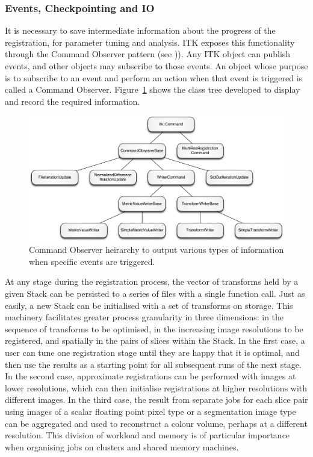 		\subsubsection{Events, Checkpointing and IO} %
		\label{ssub:events_checkpointing_and_io}
			It is necessary to save intermediate information about the progress of the registration, for parameter tuning and analysis. ITK exposes this functionality through the Command Observer pattern (see \cite{Gamma1995})). Any ITK object can publish events, and other objects may subscribe to those events. An object whose purpose is to subscribe to an event and perform an action when that event is triggered is called a Command Observer. Figure~\ref{fig:command_heirarchy} shows the class tree developed to display and record the required information.
			
    \begin{figure}[htbp]
      \centering
      \includegraphics[width=\pagewidth]{Ch5/Figs/command_heirarchy}
      \caption{Command Observer heirarchy to output various types of information when specific events are triggered.}
      \label{fig:command_heirarchy}
    \end{figure}
		
      At any stage during the registration process, the vector of transforms held by a given Stack can be persisted to a series of files with a single function call. Just as easily, a new Stack can be initialised with a set of transforms on storage. This machinery facilitates greater process granularity in three dimensions: in the sequence of transforms to be optimised, in the increasing image resolutions to be registered, and spatially in the pairs of slices within the Stack. In the first case, a user can tune one registration stage until they are happy that it is optimal, and then use the results as a starting point for all subsequent runs of the next stage. In the second case, approximate registrations can be performed with images at lower resolutions, which can then initialise registrations at higher resolutions with different images. In the third case, the result from separate jobs for each slice pair using images of a scalar floating point pixel type or a segmentation image type can be aggregated and used to reconstruct a colour volume, perhaps at a different resolution. This division of workload and memory is of particular importance when organising jobs on clusters and shared memory machines.
			
